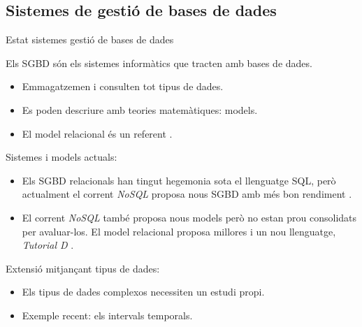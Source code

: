 \subsection[SGBD]{Sistemes de gestió de bases de dades}
\begin{frame}{Estat sistemes gestió de bases de dades}

  Els SGBD són els sistemes informàtics que tracten amb bases de
  dades. 

  \begin{itemize}  

  \item Emmagatzemen i consulten tot tipus de dades.

  \item Es poden descriure amb teories matemàtiques: models.

  \item El model relacional és un
    referent \parencite{date:introduction}.

  \end{itemize}
  
Sistemes i models actuals:

  \begin{itemize}  

  \item Els SGBD relacionals han tingut hegemonia sota el llenguatge
    SQL, però actualment el corrent \emph{NoSQL} proposa nous SGBD amb
    més bon rendiment \parencite{stonebraker10}.


  \item El corrent \emph{NoSQL} també proposa nous models però no
    estan prou consolidats per avaluar-los. El model relacional
    proposa millores i un nou llenguatge, \emph{Tutorial
      D} \parencite{date06,date:thethirdmanifesto}.

  \end{itemize}

  Extensió mitjançant tipus de dades:

  \begin{itemize}

  \item Els tipus de dades complexos necessiten un estudi propi.

  \item Exemple recent: els intervals temporals.

  \end{itemize}
  
\end{frame}


